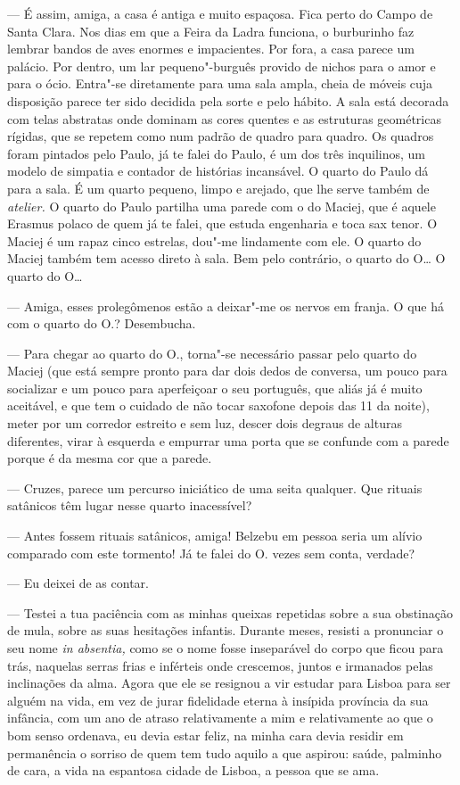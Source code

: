 --- É assim, amiga, a casa é antiga e muito espaçosa. Fica perto do Campo de
Santa Clara. Nos dias em que a
Feira da Ladra funciona, o burburinho faz lembrar bandos de aves enormes
e impacientes. Por fora, a casa parece um palácio. Por dentro, um lar
pequeno"-burguês provido de nichos para o amor e para o ócio. Entra"-se
diretamente para uma sala ampla, cheia de móveis cuja disposição parece
ter sido decidida pela sorte e pelo hábito. A sala está decorada com
telas abstratas onde dominam as cores quentes e as estruturas geométricas rígidas, que se repetem como num padrão de quadro para quadro.
Os quadros foram pintados pelo Paulo, já te falei do Paulo, é um dos
três inquilinos, um modelo de simpatia e contador de histórias
incansável. O quarto do Paulo dá para a sala. É um quarto pequeno, limpo
e arejado, que lhe serve também de \emph{atelier. }O quarto do Paulo
partilha uma parede com o do Maciej, que é aquele Erasmus polaco de quem
já te falei, que estuda engenharia e toca sax tenor. O Maciej é um rapaz
cinco estrelas, dou"-me lindamente com ele. O quarto do Maciej também tem
acesso direto à sala. Bem pelo contrário, o quarto do O\ldots{} O quarto do
O\ldots{}

--- Amiga, esses prolegômenos estão a deixar"-me os nervos em franja. O que
  há com o quarto do O.? Desembucha.

--- Para chegar ao quarto do O., torna"-se necessário passar pelo quarto do
  Maciej (que está sempre pronto para dar dois dedos de conversa, um
  pouco para socializar e um pouco para aperfeiçoar o seu português, que
  aliás já é muito aceitável, e que tem o cuidado de não tocar saxofone
  depois das 11 da noite), meter por um corredor estreito e sem luz,
  descer dois degraus de alturas diferentes, virar à esquerda e empurrar
  uma porta que se confunde com a parede porque é da mesma cor que a
  parede.

--- Cruzes, parece um percurso iniciático de uma seita qualquer. Que
  rituais satânicos têm lugar nesse quarto inacessível?

--- Antes fossem rituais satânicos, amiga! Belzebu em pessoa seria um
  alívio comparado com este tormento! Já te falei do O. vezes sem conta,
  verdade?

--- Eu deixei de as contar.

--- Testei a tua paciência com as minhas queixas repetidas sobre a sua
  obstinação de mula, sobre as suas hesitações infantis. Durante meses,
  resisti a pronunciar o seu nome \emph{in absentia, }como se o nome
  fosse inseparável do corpo que ficou para trás, naquelas serras
  frias e inférteis onde crescemos, juntos e irmanados pelas inclinações
  da alma. Agora que ele se resignou a vir estudar para Lisboa para ser
  alguém na vida, em vez de jurar fidelidade eterna à insípida província
  da sua infância, com um ano de atraso relativamente a mim e relativamente ao que o bom senso ordenava, eu devia estar feliz, na minha
  cara devia residir em permanência o sorriso de quem tem tudo aquilo a
  que aspirou: saúde, palminho de cara, a vida na espantosa cidade de
  Lisboa, a pessoa que se ama.


